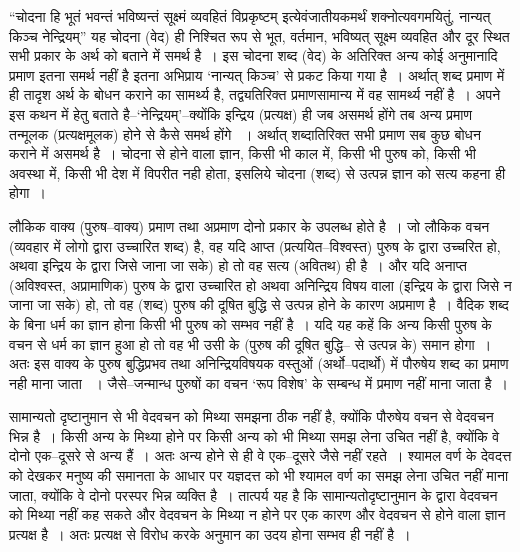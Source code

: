 “चोदना हि भूतं भवन्तं भविष्यन्तं सूक्ष्मं व्यवहितं विप्रकृष्टम् इत्येवंजातीयकमर्थं शक्नोत्य\-वगमयितुं, नान्यत् किञ्च नेन्द्रियम्” यह चोदना (वेद) ही निश्चित रूप से भूत, वर्तमान, भविष्यत् सूक्ष्म व्यवहित और दूर स्थित सभी प्रकार के अर्थ को बताने में समर्थ है~। इस चोदना शब्द (वेद) के अतिरिक्त अन्य कोई अनुमानादि प्रमाण इतना समर्थ नहीं है इतना अभिप्राय ‘नान्यत् किञ्च' से प्रकट किया गया है~। अर्थात् शब्द प्रमाण में ही तादृश अर्थ के बोधन कराने का सामर्थ्य है, तद्व्यतिरिक्त प्रमाणसामान्य में वह सामर्थ्य नहीं है~। अपने इस कथन में हेतु बताते है–‘नेन्द्रियम्'–क्योंकि इन्द्रिय (प्रत्यक्ष) ही जब असमर्थ होंगे तब अन्य प्रमाण तन्मूलक (प्रत्यक्षमूलक) होने से कैसे समर्थ होंगे ~। अर्थात् शब्दातिरिक्त सभी प्रमाण सब कुछ बोधन कराने में असमर्थ है~। चोदना से होने वाला ज्ञान, किसी भी काल में, किसी भी पुरुष को, किसी भी अवस्था में, किसी भी देश में विपरीत नही होता, इसलिये चोदना (शब्द) से उत्पन्न ज्ञान को सत्य कहना ही होगा~। 

लौकिक वाक्य (पुरुष–वाक्य) प्रमाण तथा अप्रमाण दोनो प्रकार के उपलब्ध होते है~। जो लौकिक वचन (व्यवहार में लोगो द्वारा उच्चारित शब्द) है, वह यदि आप्त (प्रत्ययित–विश्वस्त) पुरुष के द्वारा उच्चरित हो, अथवा इन्द्रिय के द्वारा जिसे जाना जा सके) हो तो वह सत्य (अवितथ) ही है~। और यदि अनाप्त (अविश्वस्त, अप्रामाणिक) पुरुष के द्वारा उच्चारित हो अथवा अनिन्द्रिय विषय वाला (इन्द्रिय के द्वारा जिसे न जाना जा सके) हो, तो वह (शब्द) पुरुष की दूषित बुद्धि से उत्पन्न होने के कारण अप्रमाण है~। वैदिक शब्द के बिना धर्म का ज्ञान होना किसी भी पुरुष को सम्भव नहीं है~। यदि यह कहें कि अन्य किसी पुरुष के वचन से धर्म का ज्ञान हुआ हो तो वह भी उसी के (पुरुष की दूषित बुद्धि– से उत्पन्न के) समान होगा~। अतः इस वाक्य के पुरुष बुद्धिप्रभव तथा अनिन्द्रियविषयक वस्तुओं (अर्थो–पदार्थो) में पौरुषेय शब्द का प्रमाण नही माना जाता ~। जैसे–जन्मान्ध पुरुषों का वचन ‘रूप विशेष' के सम्बन्ध में प्रमाण नहीं माना जाता है~।

सामान्यतो दृष्टानुमान से भी वेदवचन को मिथ्या समझना ठीक नहीं है, क्योंकि पौरुषेय वचन से वेदवचन भिन्न है~। किसी अन्य के मिथ्या होने पर किसी अन्य को भी मिथ्या समझ लेना उचित नहीं है, क्योंकि वे दोनो एक–दूसरे से अन्य हैं~। अतः अन्य होने से ही वे एक–दूसरे जैसे नहीं रहते~। श्यामल वर्ण के देवदत्त को देखकर मनुष्य की समानता के आधार पर यज्ञदत्त को भी श्यामल वर्ण का समझ लेना उचित नहीं माना जाता, क्योंकि वे दोनो परस्पर भिन्न व्यक्ति है~। तात्पर्य यह है कि सामान्यतोदृष्टानुमान के द्वारा वेदवचन को मिथ्या नहीं कह सकते और वेदवचन के मिथ्या न होने पर एक कारण और वेदवचन से होने वाला ज्ञान प्रत्यक्ष है~। अतः प्रत्यक्ष से विरोध करके अनुमान का उदय होना सम्भव ही नहीं है~।

